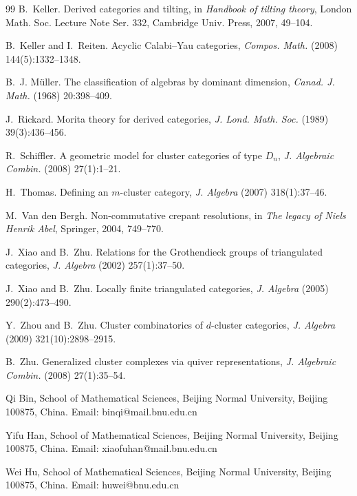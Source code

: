 \documentclass[12pt]{article}
\theoremstyle{plain}
\theoremstyle{definition}
\begin{document}
\begin{thebibliography}{99}
B.~Keller.
\newblock Derived categories and tilting,
in {\em Handbook of tilting theory}, London Math. Soc. Lecture Note Ser. 332,
Cambridge Univ. Press, 2007, 49--104.

B.~Keller and I.~Reiten.
\newblock Acyclic Calabi--Yau categories,
{\em Compos. Math.} (2008) 144(5):1332--1348.

B.~J. M\"uller.
\newblock The classification of algebras by dominant dimension,
{\em Canad. J. Math.} (1968) 20:398--409.

J.~Rickard.
\newblock Morita theory for derived categories,
{\em J. Lond. Math. Soc.} (1989) 39(3):436--456.

R.~Schiffler.
\newblock A geometric model for cluster categories of type \(D_n\),
{\em J. Algebraic Combin.} (2008) 27(1):1--21.

H.~Thomas.
\newblock Defining an \(m\)-cluster category,
{\em J. Algebra} (2007) 318(1):37--46.

M.~Van den Bergh.
\newblock Non-commutative crepant resolutions,
in {\em The legacy of Niels Henrik Abel}, Springer, 2004, 749--770.

J.~Xiao and B.~Zhu.
\newblock Relations for the Grothendieck groups of triangulated categories,
{\em J. Algebra} (2002) 257(1):37--50.

J.~Xiao and B.~Zhu.
\newblock Locally finite triangulated categories,
{\em J. Algebra} (2005) 290(2):473--490.

Y.~Zhou and B.~Zhu.
\newblock Cluster combinatorics of \(d\)-cluster categories,
{\em J. Algebra} (2009) 321(10):2898--2915.

B.~Zhu.
\newblock Generalized cluster complexes via quiver representations,
{\em J. Algebraic Combin.} (2008) 27(1):35--54.

\end{thebibliography}


\medskip 
Qi Bin, School of Mathematical Sciences, Beijing Normal University, Beijing 100875, China. Email: binqi@mail.bnu.edu.cn

\medskip 
Yifu Han, School of Mathematical Sciences, Beijing Normal University, Beijing 100875, China. Email: 
xiaofuhan@mail.bnu.edu.cn

\medskip 
Wei Hu, School of Mathematical Sciences, Beijing Normal University, Beijing 100875, China. Email: huwei@bnu.edu.cn
\end{document}
